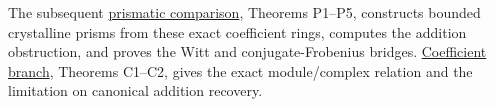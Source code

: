 \documentclass[
]{article}
\begin{document}
The subsequent
\href{https://github.com/KokunoYumeto/zeta-function-research-reader/blob/6af54ea3c8ef99127af327f3103e086c68d482c2/workbenches/splitzero-tandem/branches/identity-absorber-square/PRISMATIC_COMPARISON.md}{prismatic
comparison}, Theorems P1--P5, constructs bounded crystalline prisms from
these exact coefficient rings, computes the addition obstruction, and
proves the Witt and conjugate-Frobenius bridges.
\href{https://github.com/KokunoYumeto/zeta-function-research-reader/blob/6af54ea3c8ef99127af327f3103e086c68d482c2/workbenches/splitzero-tandem/branches/identity-absorber-square/COEFFICIENT_BRANCH.md}{Coefficient
branch}, Theorems C1--C2, gives the exact module/complex relation and
the limitation on canonical addition recovery.
\end{document}
